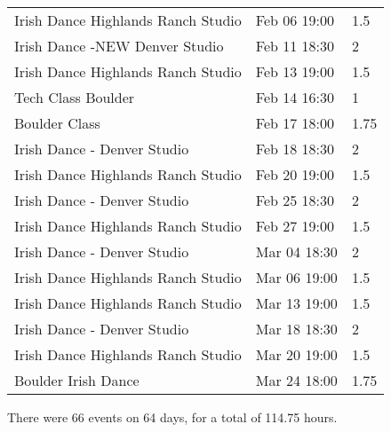 \documentclass[a4paper]{article}
\begin{document}
\begin{longtable}{lll}
Irish Dance Highlands Ranch Studio & Feb 06 19:00 & 1.5 \\
Irish Dance -NEW Denver Studio & Feb 11 18:30 & 2 \\
Irish Dance Highlands Ranch Studio & Feb 13 19:00 & 1.5 \\
Tech Class Boulder & Feb 14 16:30 & 1 \\
Boulder Class & Feb 17 18:00 & 1.75 \\
Irish Dance - Denver Studio & Feb 18 18:30 & 2 \\
Irish Dance Highlands Ranch Studio & Feb 20 19:00 & 1.5 \\
Irish Dance - Denver Studio & Feb 25 18:30 & 2 \\
Irish Dance Highlands Ranch Studio & Feb 27 19:00 & 1.5 \\
Irish Dance - Denver Studio & Mar 04 18:30 & 2 \\
Irish Dance Highlands Ranch Studio & Mar 06 19:00 & 1.5 \\
Irish Dance Highlands Ranch Studio & Mar 13 19:00 & 1.5 \\
Irish Dance - Denver Studio & Mar 18 18:30 & 2 \\
Irish Dance Highlands Ranch Studio & Mar 20 19:00 & 1.5 \\
Boulder Irish Dance & Mar 24 18:00 & 1.75 \\
\end{longtable}

\noindent There were 66 events on 64 days, for a total of 114.75 hours.
\end{document}
